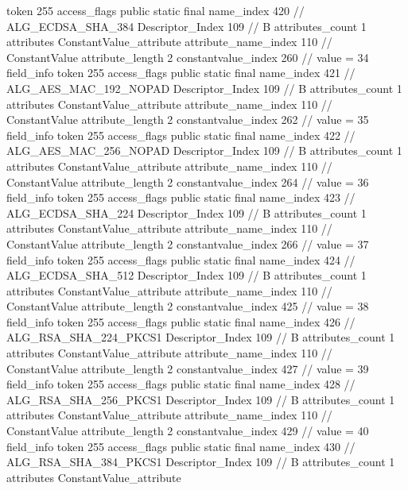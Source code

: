 {{{{{				token	255
				access_flags	public static final
				name_index	420		// ALG_ECDSA_SHA_384
				Descriptor_Index	109		// B
				attributes_count	1
				attributes {
				ConstantValue_attribute {
					attribute_name_index	110		// ConstantValue
					attribute_length	2
					constantvalue_index	260		// value = 34
				}
				}
			}
			field_info {
				token	255
				access_flags	public static final
				name_index	421		// ALG_AES_MAC_192_NOPAD
				Descriptor_Index	109		// B
				attributes_count	1
				attributes {
				ConstantValue_attribute {
					attribute_name_index	110		// ConstantValue
					attribute_length	2
					constantvalue_index	262		// value = 35
				}
				}
			}
			field_info {
				token	255
				access_flags	public static final
				name_index	422		// ALG_AES_MAC_256_NOPAD
				Descriptor_Index	109		// B
				attributes_count	1
				attributes {
				ConstantValue_attribute {
					attribute_name_index	110		// ConstantValue
					attribute_length	2
					constantvalue_index	264		// value = 36
				}
				}
			}
			field_info {
				token	255
				access_flags	public static final
				name_index	423		// ALG_ECDSA_SHA_224
				Descriptor_Index	109		// B
				attributes_count	1
				attributes {
				ConstantValue_attribute {
					attribute_name_index	110		// ConstantValue
					attribute_length	2
					constantvalue_index	266		// value = 37
				}
				}
			}
			field_info {
				token	255
				access_flags	public static final
				name_index	424		// ALG_ECDSA_SHA_512
				Descriptor_Index	109		// B
				attributes_count	1
				attributes {
				ConstantValue_attribute {
					attribute_name_index	110		// ConstantValue
					attribute_length	2
					constantvalue_index	425		// value = 38
				}
				}
			}
			field_info {
				token	255
				access_flags	public static final
				name_index	426		// ALG_RSA_SHA_224_PKCS1
				Descriptor_Index	109		// B
				attributes_count	1
				attributes {
				ConstantValue_attribute {
					attribute_name_index	110		// ConstantValue
					attribute_length	2
					constantvalue_index	427		// value = 39
				}
				}
			}
			field_info {
				token	255
				access_flags	public static final
				name_index	428		// ALG_RSA_SHA_256_PKCS1
				Descriptor_Index	109		// B
				attributes_count	1
				attributes {
				ConstantValue_attribute {
					attribute_name_index	110		// ConstantValue
					attribute_length	2
					constantvalue_index	429		// value = 40
				}
				}
			}
			field_info {
				token	255
				access_flags	public static final
				name_index	430		// ALG_RSA_SHA_384_PKCS1
				Descriptor_Index	109		// B
				attributes_count	1
				attributes {
				ConstantValue_attribute {
}}}}}}}
